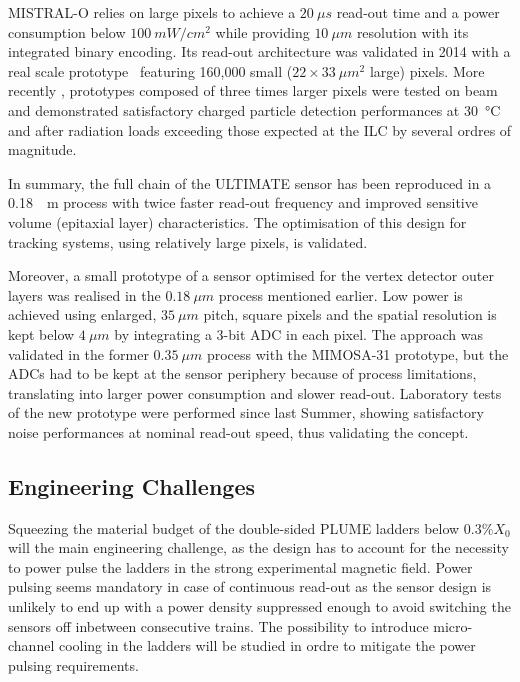 MISTRAL-O relies on large pixels to achieve a $\SI{20}{\mu s}$ read-out
time and a power consumption below $\SI{100}{mW/cm^2}$ while providing
$\SI{10}{\mu m}$ resolution with its integrated binary encoding.
Its read-out architecture was validated in 2014 with a real scale
prototype~\cite{Winter:NSSMIC:2014} featuring 160,000 small ($22\times\SI{33}{\mu m^2}$
large) pixels. More recently \cite{Winter:ALCW15}, prototypes composed of
three times larger pixels were tested on beam and demonstrated satisfactory
charged particle detection performances at
\SI{30}{\degreeCelsius} and after radiation loads exceeding those expected at the
ILC by several ordres of magnitude.

In summary, the full chain of the ULTIMATE sensor has been reproduced
in a \SI{0.18}{\mu m} process with twice faster read-out frequency and
improved sensitive volume (epitaxial layer) characteristics. The
optimisation of this design for tracking systems, using relatively
large pixels, is validated.

Moreover, a small prototype of a sensor optimised for the vertex detector
outer layers was realised in the $\SI{0.18}{\mu m}$ process mentioned earlier.
Low power is achieved using enlarged, $\SI{35}{\mu m}$ pitch, square pixels and the
spatial resolution is kept below $\SI{4}{\mu m}$ by integrating a 3-bit ADC in
each pixel. The approach was validated in the former $\SI{0.35}{\mu m}$ process
with the MIMOSA-31 prototype, but the ADCs had to be kept at the sensor
periphery because of process limitations, translating into larger
power consumption and slower read-out. Laboratory tests of the new
prototype were performed since last Summer, showing satisfactory noise performances at nominal read-out speed, thus validating the concept.


\subsection{Engineering Challenges}
Squeezing the material budget of the double-sided PLUME ladders
below $0.3\% X_0$ will the main engineering challenge, as the design
has to account for the necessity to power pulse the ladders in the
strong experimental magnetic field. Power pulsing seems mandatory
in case of continuous read-out as the sensor design is unlikely to
end up with a power density suppressed enough to avoid switching
the sensors off inbetween consecutive trains. The possibility to
introduce micro-channel cooling in the ladders will be studied in
ordre to mitigate the power pulsing requirements.

